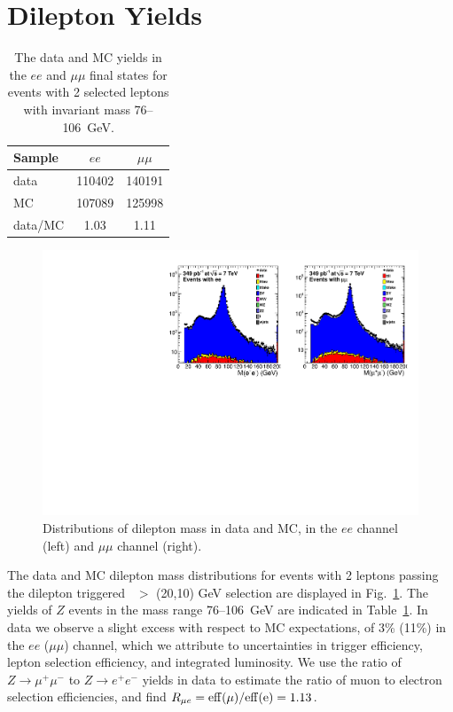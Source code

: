 
\section{Dilepton Yields}

\begin{table}[htb]
\begin{center}
\caption{\label{tab:lepyields}
The data and MC yields in the $ee$ and $\mu\mu$ final states for events with 2 selected
leptons with invariant mass 76--106~GeV.
}
\begin{tabular}{l|cc}
\hline
         Sample   &           $ee$   &       $\mu\mu$   \\
\hline
data              &         110402   &         140191   \\
MC                &         107089   &         125998   \\
\hline
data/MC           &           1.03   &           1.11   \\
\hline
\end{tabular}
\end{center}
\end{table}

\begin{figure}[!htb]
\begin{center}
\includegraphics[width=1.0\linewidth]{plots/dilmass_349pb.pdf}
\caption{\label{fig:Z}\protect Distributions of dilepton mass in data and MC,
in the $ee$ channel (left) and $\mu\mu$ channel (right). 
}
\end{center}
\end{figure}

The data and MC dilepton mass distributions for events with 2 leptons passing the dilepton triggered 
\pt\ $>$ (20,10) GeV selection are displayed in Fig.~\ref{fig:Z}.
The yields of $Z$ events in the mass range 76--106~GeV are indicated in Table~\ref{tab:lepyields}. 
In data we observe a slight excess with respect to MC expectations, of 3\% (11\%) in the $ee$ ($\mu\mu$) channel,
which we attribute to uncertainties in trigger efficiency, lepton selection efficiency, and integrated
luminosity. We use the ratio of $Z \to \mu^+\mu^-$ to $Z \to e^+e^-$ yields in data to estimate the
ratio of muon to electron selection efficiencies, and find $R_{\mu e} = \rm{eff}(\mu)/\rm{eff}(e) = 1.13$.

